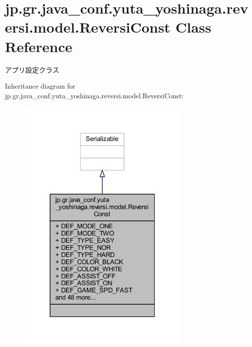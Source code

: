 \hypertarget{classjp_1_1gr_1_1java__conf_1_1yuta__yoshinaga_1_1reversi_1_1model_1_1_reversi_const}{}\section{jp.\+gr.\+java\+\_\+conf.\+yuta\+\_\+yoshinaga.\+reversi.\+model.\+Reversi\+Const Class Reference}
\label{classjp_1_1gr_1_1java__conf_1_1yuta__yoshinaga_1_1reversi_1_1model_1_1_reversi_const}


アプリ設定クラス  




Inheritance diagram for jp.\+gr.\+java\+\_\+conf.\+yuta\+\_\+yoshinaga.\+reversi.\+model.\+Reversi\+Const\+:
\nopagebreak
\begin{figure}[H]
\begin{center}
\leavevmode
\includegraphics[width=241pt]{classjp_1_1gr_1_1java__conf_1_1yuta__yoshinaga_1_1reversi_1_1model_1_1_reversi_const__inherit__graph}
\end{center}
\end{figure}


